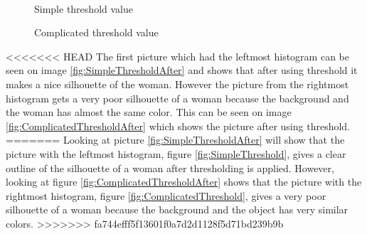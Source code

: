 \begin{figure}[htbp]
\begin{minipage}[b]{0.45\textwidth}
\end{minipage} \\ %
\begin{minipage}[t]{0.45\textwidth}
\caption{Simple threshold value} %
\label{fig:SimpleThreshold}
\end{minipage} \hfill
\begin{minipage}[t]{0.45\textwidth}
\caption{Complicated threshold value} %
\label{fig:ComplicatedThreshold}
\end{minipage}
\end{figure}

<<<<<<< HEAD
The first picture which had the leftmost histogram can be seen on image \eqref{fig:SimpleThresholdAfter} and shows that after using threshold it makes a nice silhouette of the woman. However the picture from the rightmost histogram gets a very poor silhouette of a woman because the background and the woman has almost the same color. This can be seen on image \eqref{fig:ComplicatedThresholdAfter} which shows the picture after using threshold.
=======
Looking at picture \eqref{fig:SimpleThresholdAfter} will show that the picture with the leftmost histogram, figure \eqref{fig:SimpleThreshold}, gives a clear outline of the silhouette of a woman after thresholding is applied. However, looking at figure \eqref{fig:ComplicatedThresholdAfter} shows that the picture with the rightmost histogram, figure \eqref{fig:ComplicatedThreshold}, gives a very poor silhouette of a woman because the background and the object has very similar colors. 
>>>>>>> fa744efff5f13601f0a7d2d1128f5d71bd239b9b

